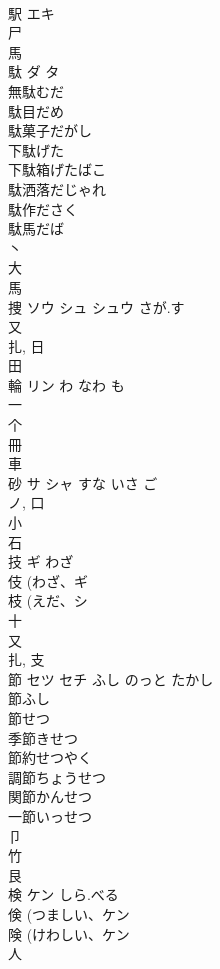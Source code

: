 \documentclass[8pt]{extreport}
\begin{document}
\begin{CJK}{UTF8}{min}
\\	駅	エキ		
\\	尸 
\\	馬 
\\	駄	ダ タ		
\\	無駄むだ
\\	駄目だめ
\\	駄菓子だがし
\\	下駄げた
\\	下駄箱げたばこ
\\	駄洒落だじゃれ
\\	駄作ださく
\\	駄馬だば
\\	丶 
\\	大 
\\	馬 
\\	捜	ソウ シュ シュウ	さが.す	
\\	又 
\\	扎, 日 
\\	田 
\\	輪	リン	わ なわ も	
\\	一 
\\	个 
\\	冊 
\\	車 
\\	砂	サ シャ	すな いさ ご	
\\	ノ, 口 
\\	小 
\\	石 
\\	技	ギ	わざ	
\\	伎 (わざ、ギ 
\\	枝 (えだ、シ 
\\	十 
\\	又 
\\	扎, 支 
\\	節	セツ セチ	ふし のっと たかし	
\\	節ふし
\\	節せつ
\\	季節きせつ
\\	節約せつやく
\\	調節ちょうせつ
\\	関節かんせつ
\\	一節いっせつ
\\	卩 
\\	竹 
\\	艮 
\\	検	ケン	しら.べる	
\\	倹 (つましい、ケン 
\\	険 (けわしい、ケン 
\\	人 

\end{CJK}
\end{document}
